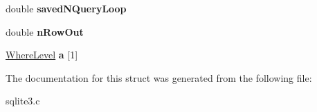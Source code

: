 \begin{DoxyCompactItemize}
\item 
\hypertarget{struct_where_info_a42261b8c4fbc968e0096fa13ea4c00a7}{double {\bfseries saved\-N\-Query\-Loop}}\label{struct_where_info_a42261b8c4fbc968e0096fa13ea4c00a7}

\item 
\hypertarget{struct_where_info_aca7831db346643eddd5520c3bce4b7bb}{double {\bfseries n\-Row\-Out}}\label{struct_where_info_aca7831db346643eddd5520c3bce4b7bb}

\item 
\hypertarget{struct_where_info_a427337160cbeaf64b23a8241fb10dbf9}{\hyperlink{struct_where_level}{Where\-Level} {\bfseries a} \mbox{[}1\mbox{]}}\label{struct_where_info_a427337160cbeaf64b23a8241fb10dbf9}

\end{DoxyCompactItemize}


The documentation for this struct was generated from the following file\-:\begin{DoxyCompactItemize}
\item 
sqlite3.\-c\end{DoxyCompactItemize}
